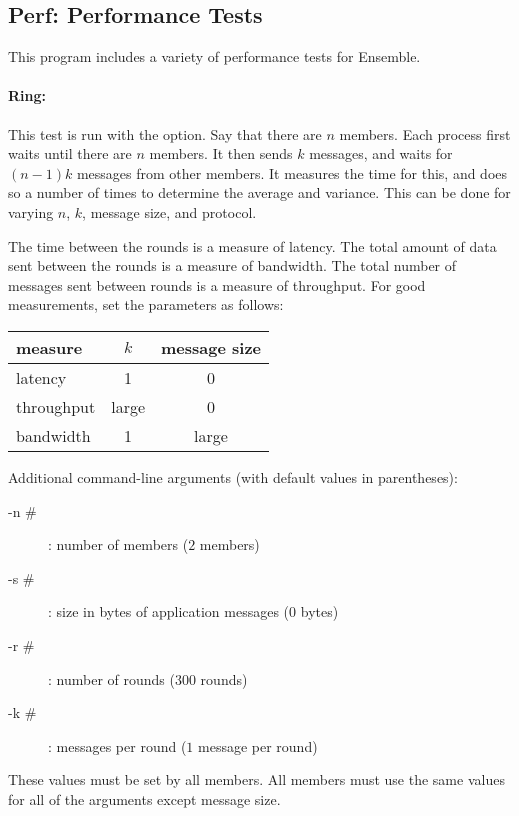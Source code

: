 \subsection{Perf: Performance Tests}
This program includes a variety of performance tests for Ensemble.

\paragraph{Ring:}
This test is run with the  option.  Say that there are $n$
members.  Each process first waits until there are $n$ members.  It then sends
$k$ messages, and waits for $(n - 1)k$ messages from other members.  It
measures the time for this, and does so a number of times to determine the
average and variance.  This can be done for varying $n$, $k$, message size, and
protocol.

The time between the rounds is a measure of latency.  The total amount of data
sent between the rounds is a measure of bandwidth.  The total number of
messages sent between rounds is a measure of throughput.  For good
measurements, set the parameters as follows:

\begin{center}
\begin{tabular}{|l|c|c|}			   \hline
measure		& $k$		& message size	\\ \hline \hline
latency		&  1		& 0		\\ \hline
throughput	& large		& 0		\\ \hline
bandwidth	&  1		& large		\\ \hline
\end{tabular}
\end{center}

Additional command-line arguments (with default values in parentheses):
\begin{description}
\item [-n \#]: number of members ($2$ members)
\item [-s \#]: size in bytes of application messages ($0$ bytes)
\item [-r \#]: number of rounds ($300$ rounds)
\item [-k \#]: messages per round ($1$ message per round)
\end{description}
These values must be set by all members.  All members must use the same values for
all of the arguments except message size.


